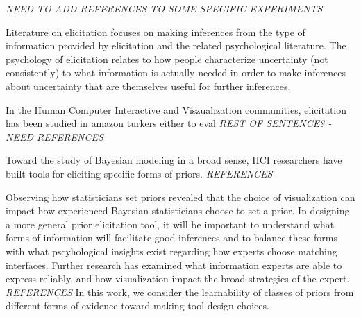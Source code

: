 \textit{NEED TO ADD REFERENCES TO SOME SPECIFIC EXPERIMENTS}

Literature on elicitation focuses on making inferences from the type of information provided by elicitation and the related psychological literature. The psychology of elicitation relates to how people characterize uncertainty (not consistently) to what information is actually needed in order to make inferences about uncertainty that are themselves useful for further inferences. 

In the Human Computer Interactive and Viszualization communities, elicitation has been studied in amazon turkers either to eval \textit{REST OF SENTENCE? -  NEED REFERENCES}

Toward the study of Bayesian modeling in a broad sense, HCI researchers have built tools for eliciting specific forms of priors. \textit{REFERENCES} 

Observing how statisticians set priors revealed that the choice of visualization can impact how experienced Bayesian statisticians choose to set a prior. In designing a more general prior elicitation tool, it will be important to understand what forms of information will facilitate good inferences and to balance these forms with what pscyhological insights exist regarding how experts choose matching interfaces. Further research has examined what information experts are able to express reliably, and how visualization impact the broad strategies of the expert. \textit{REFERENCES} In this work, we consider the learnability of classes of priors from different forms of evidence toward making tool design choices. 


